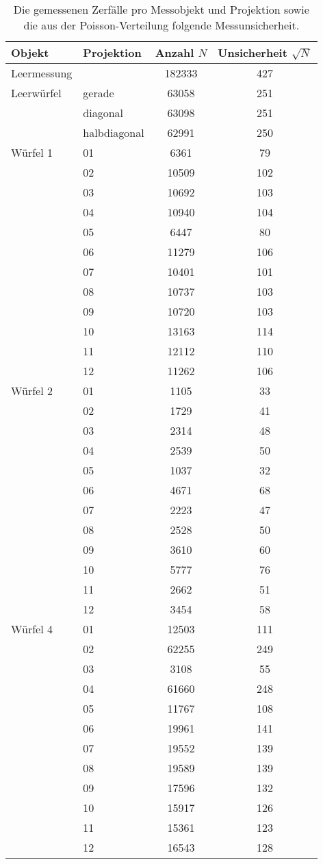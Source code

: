 \begin{table}[p]
  \centering
  \begin{tabular}{llS[table-format=6.0]S[table-format=3.0]}
    \toprule
    {Objekt}&{Projektion}&{Anzahl $N$}&{Unsicherheit $\sqrt{N}$}\\
    \midrule
Leermessung&&            182333&   427\\
Leerwürfel &gerade&  63058&    251\\
 &diagonal&  63098&    251\\
 &halbdiagonal&  62991&    250\\
Würfel 1 & 01&  6361&     79\\
  & 02&  10509&    102\\
  & 03&  10692&    103\\
  & 04&  10940&    104\\
  & 05&  6447&     80\\
  & 06&  11279&    106\\
  & 07&  10401&    101\\
  & 08&  10737&    103\\
  & 09&  10720&    103\\
  & 10&  13163&    114\\
  & 11&  12112&    110\\
  & 12&  11262&    106\\
Würfel 2 & 01&  1105&     33\\
  & 02&  1729&     41\\
  & 03&  2314&     48\\
  & 04&  2539&     50\\
  & 05&  1037&     32\\
  & 06&  4671&     68\\
  & 07&  2223&     47\\
  & 08&  2528&     50\\
  & 09&  3610&     60\\
  & 10&  5777&     76\\
  & 11&  2662&     51\\
  & 12&  3454&     58\\
Würfel 4 & 01&  12503&    111\\
  & 02&  62255&    249\\
  & 03&  3108&     55 \\
  & 04&  61660&    248\\
  & 05&  11767&    108\\
  & 06&  19961&    141\\
  & 07&  19552&    139\\
  & 08&  19589&    139\\
  & 09&  17596&    132\\
  & 10&  15917&    126\\
  & 11&  15361&    123\\
  & 12&  16543&    128\\
  \bottomrule
\end{tabular}
\caption{Die gemessenen Zerfälle pro Messobjekt und Projektion sowie die aus der
Poisson-Verteilung folgende Messunsicherheit.}
\label{tab:messwerte_intensitaet}
\end{table}
